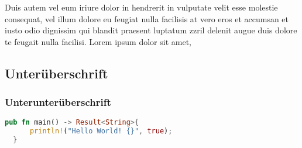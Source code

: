 \documentclass[11pt, manuscript, screen, nonacm=true, natbib=true]{acmart-backref}
\begin{document}
Duis autem vel eum iriure dolor in hendrerit in vulputate velit esse molestie consequat, vel illum dolore eu feugiat nulla facilisis at vero eros et accumsan et iusto odio dignissim qui blandit praesent luptatum zzril delenit augue duis dolore te feugait nulla facilisi. Lorem ipsum dolor sit amet,

\subsection{Unterüberschrift}

\subsubsection{Unterunterüberschrift}

\begin{lstlisting}[language=Rust]
  pub fn main() -> Result<String>{
      println!("Hello World! {}", true);
  }
  \end{lstlisting}



\end{document}
